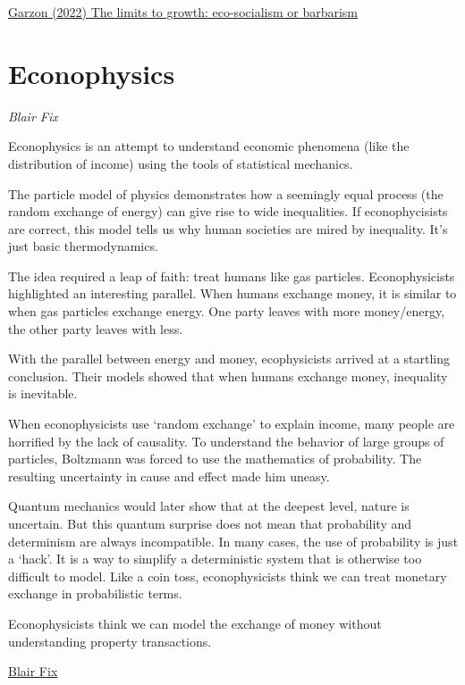\documentclass[
]{book}
\begin{document}
\href{https://la-u.org/the-limits-to-growth-eco-socialism-or-barbarism/}{Garzon (2022) The limits to growth: eco-socialism or barbarism}

\hypertarget{econophysics}{%
\chapter{Econophysics}\label{econophysics}}

\emph{Blair Fix}

Econophysics is an attempt to understand economic phenomena
(like the distribution of income)
using the tools of statistical mechanics.

The particle model of physics demonstrates how a seemingly equal process
(the random exchange of energy)
can give rise to wide inequalities.
If econophycisists are correct,
this model tells us why human societies are mired by inequality.
It's just basic thermodynamics.

The idea required a leap of faith: treat humans like gas particles.
Econophysicists highlighted an interesting parallel.
When humans exchange money, it is similar to when gas particles exchange energy.
One party leaves with more money/energy, the other party leaves with less.

With the parallel between energy and money, ecophysicists arrived at a startling conclusion.
Their models showed that when humans exchange money, inequality is inevitable.

When econophysicists use `random exchange' to explain income,
many people are horrified by the lack of causality.
To understand the behavior of large groups of particles,
Boltzmann was forced to use the mathematics of probability.
The resulting uncertainty in cause and effect made him uneasy.

Quantum mechanics would later show that at the deepest level, nature is uncertain.
But this quantum surprise does not mean that probability and determinism are always incompatible.
In many cases, the use of probability is just a `hack'.
It is a way to simplify a deterministic system that is otherwise too difficult to model.
Like a coin toss, econophysicists think we can treat monetary exchange in probabilistic terms.

Econophysicists think we can model the exchange of money without understanding property transactions.

\href{https://economicsfromthetopdown.com/2021/03/12/energizing-exchange-learning-from-econophysics-mistakes/}{Blair Fix}
\end{document}
